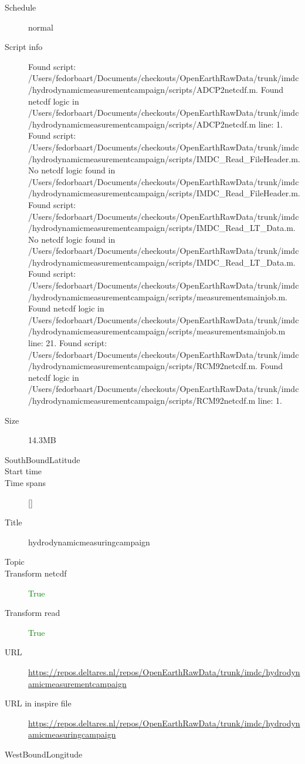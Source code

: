 \documentclass[9]{report}
\begin{document}
\begin{description}
\begin{verbatim}
\end{verbatim}
  \item[Schedule] normal
  \item[Script info] Found script: /Users/fedorbaart/Documents/checkouts/OpenEarthRawData/trunk/imdc/hydrodynamicmeasurementcampaign/scripts/ADCP2netcdf.m.
Found netcdf logic in /Users/fedorbaart/Documents/checkouts/OpenEarthRawData/trunk/imdc/hydrodynamicmeasurementcampaign/scripts/ADCP2netcdf.m line: 1.
Found script: /Users/fedorbaart/Documents/checkouts/OpenEarthRawData/trunk/imdc/hydrodynamicmeasurementcampaign/scripts/IMDC\_Read\_FileHeader.m.
No netcdf logic found in /Users/fedorbaart/Documents/checkouts/OpenEarthRawData/trunk/imdc/hydrodynamicmeasurementcampaign/scripts/IMDC\_Read\_FileHeader.m.
Found script: /Users/fedorbaart/Documents/checkouts/OpenEarthRawData/trunk/imdc/hydrodynamicmeasurementcampaign/scripts/IMDC\_Read\_LT\_Data.m.
No netcdf logic found in /Users/fedorbaart/Documents/checkouts/OpenEarthRawData/trunk/imdc/hydrodynamicmeasurementcampaign/scripts/IMDC\_Read\_LT\_Data.m.
Found script: /Users/fedorbaart/Documents/checkouts/OpenEarthRawData/trunk/imdc/hydrodynamicmeasurementcampaign/scripts/measurementsmainjob.m.
Found netcdf logic in /Users/fedorbaart/Documents/checkouts/OpenEarthRawData/trunk/imdc/hydrodynamicmeasurementcampaign/scripts/measurementsmainjob.m line: 21.
Found script: /Users/fedorbaart/Documents/checkouts/OpenEarthRawData/trunk/imdc/hydrodynamicmeasurementcampaign/scripts/RCM92netcdf.m.
Found netcdf logic in /Users/fedorbaart/Documents/checkouts/OpenEarthRawData/trunk/imdc/hydrodynamicmeasurementcampaign/scripts/RCM92netcdf.m line: 1.
  \item[Size] 14.3MB
  \item[SouthBoundLatitude] 
  \item[Start time] 
  \item[Time spans] []
  \item[Title]  hydrodynamicmeasuringcampaign 
  \item[Topic] 
  \item[Transform netcdf] \textcolor{green}{True}
  \item[Transform read] \textcolor{green}{True}
  \item[URL] \href{https://repos.deltares.nl/repos/OpenEarthRawData/trunk/imdc/hydrodynamicmeasurementcampaign}{https://repos.deltares.nl/repos/OpenEarthRawData/trunk/imdc/hydrodynamicmeasurementcampaign}
  \item[URL in inspire file] \href{https://repos.deltares.nl/repos/OpenEarthRawData/trunk/imdc/hydrodynamicmeasuringcampaign}{https://repos.deltares.nl/repos/OpenEarthRawData/trunk/imdc/hydrodynamicmeasuringcampaign}
  \item[WestBoundLongitude] 
\end{description}
\end{document}
